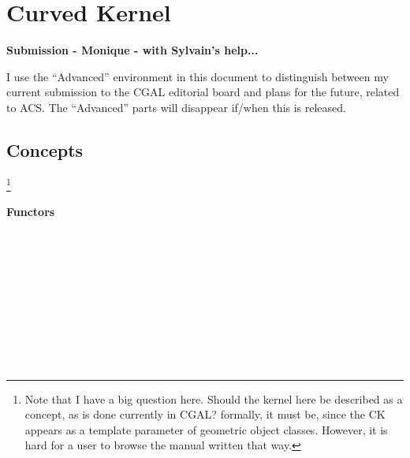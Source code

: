 \chapter{Curved Kernel}

\textbf{Submission - Monique - with Sylvain's help...}

\begin{ccAdvanced}
I use the ``Advanced'' environment in this document to distinguish
between my current submission to the CGAL editorial board and plans
for the future, related to ACS. The ``Advanced'' parts will disappear
if/when this is released. 
\end{ccAdvanced}

\section*{Concepts}

\footnote{Note that I have a big question here. Should the kernel here
be described as a concept, as is done currently in CGAL? formally, it
must be, since the CK appears as a template parameter of geometric
object classes. However, it is hard for a user to browse the manual
written that way.}



\begin{ccAdvanced}
\end{ccAdvanced}

	\subsubsection*{Functors} 

\\
\\

\\
\\
\\

\\
\\
\\


